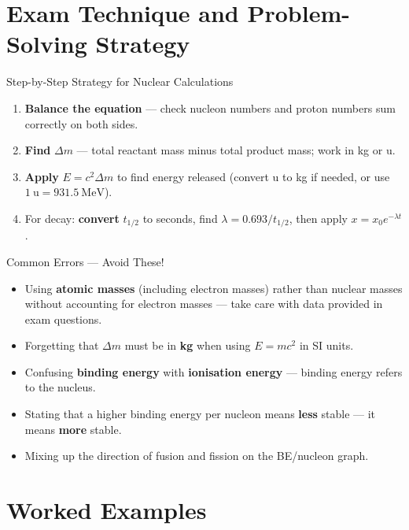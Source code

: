 \section{Exam Technique and Problem-Solving Strategy}

\begin{keybox}{Step-by-Step Strategy for Nuclear Calculations}
\begin{enumerate}[itemsep=3pt]
  \item \textbf{Balance the equation} — check nucleon numbers and proton numbers sum correctly on both sides.
  \item \textbf{Find} $\Delta m$ — total reactant mass minus total product mass; work in kg or u.
  \item \textbf{Apply} $E = c^2\Delta m$ to find energy released (convert u to kg if needed, or use $1\ \text{u} = 931.5\ \text{MeV}$).
  \item For decay: \textbf{convert} $t_{1/2}$ to seconds, find $\lambda = 0.693/t_{1/2}$, then apply $x = x_0 e^{-\lambda t}$.
\end{enumerate}
\end{keybox}

\begin{warningbox}{Common Errors — Avoid These!}
\begin{itemize}[itemsep=3pt]
  \item Using \textbf{atomic masses} (including electron masses) rather than nuclear masses without accounting for electron masses — take care with data provided in exam questions.
  \item Forgetting that $\Delta m$ must be in \textbf{kg} when using $E = mc^2$ in SI units.
  \item Confusing \textbf{binding energy} with \textbf{ionisation energy} — binding energy refers to the nucleus.
  \item Stating that a higher binding energy per nucleon means \textbf{less} stable — it means \textbf{more} stable.
  \item Mixing up the direction of fusion and fission on the BE/nucleon graph.
\end{itemize}
\end{warningbox}

\section{Worked Examples}

